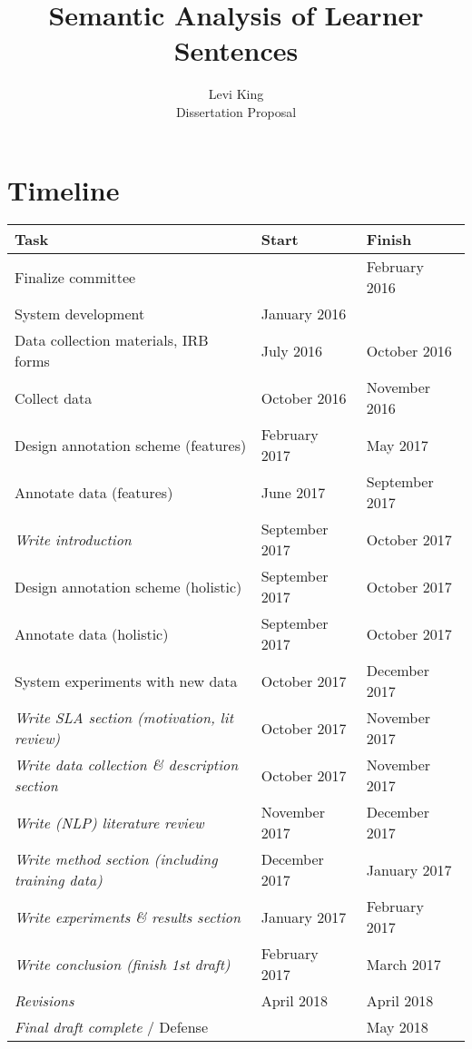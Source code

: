\documentclass[11pt]{article}
\title{Semantic Analysis of Learner Sentences}
\author{Levi King \\ Dissertation Proposal}
\begin{document}
\maketitle

\section{Timeline}
\begin{center}
\begin{tabular}{|l|l|l|}
  \hline
  \textbf{Task} & \textbf{Start} & \textbf{Finish} \\
  \hline
  \hline
  Finalize committee & & February 2016 \\
  \hline
  \hline
  System development & January 2016 &  \\
  \hline
  Data collection materials, IRB forms & July 2016 & October 2016 \\
  \hline
  Collect data & October 2016 & November 2016 \\
  \hline
  Design annotation scheme (features) & February 2017 & May 2017 \\
  \hline
  Annotate data (features) & June 2017 & September 2017 \\
  \hline
  \textit{Write introduction} & September 2017 & October 2017 \\
  \hline
  Design annotation scheme (holistic) & September 2017 & October 2017 \\
  \hline
  Annotate data (holistic) & September 2017 & October 2017 \\
  \hline
  System experiments with new data & October 2017 & December 2017 \\
  \hline
  \textit{Write SLA section (motivation, lit review)} & October 2017 & November 2017 \\
  \hline
  \textit{Write data collection \& description section} & October 2017 & November 2017 \\
  \hline
  \textit{Write (NLP) literature review} & November 2017 & December 2017 \\
  \hline
  \textit{Write method section (including training data)} & December 2017 & January 2017 \\
  \hline
  \textit{Write experiments \& results section} & January 2017 & February 2017 \\
  \hline
  \textit{Write conclusion (finish 1st draft)} & February 2017 & March 2017 \\
  \hline
  \textit{Revisions} & April 2018 & April 2018 \\
  \hline
  \textit{Final draft complete} / Defense & & May 2018 \\
  \hline
\end{tabular}
\end{center}
\end{document}
